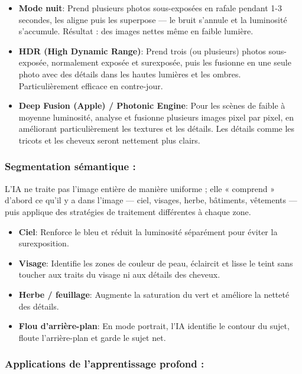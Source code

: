 \begin{itemize}
  \item \textbf{Mode nuit}: Prend plusieurs photos sous-exposées en rafale pendant 1-3 secondes, les aligne puis les superpose — le bruit s'annule et la luminosité s'accumule. Résultat : des images nettes même en faible lumière.
  \item \textbf{HDR (High Dynamic Range)}: Prend trois (ou plusieurs) photos sous-exposée, normalement exposée et surexposée, puis les fusionne en une seule photo avec des détails dans les hautes lumières et les ombres. Particulièrement efficace en contre-jour.
  \item \textbf{Deep Fusion (Apple) / Photonic Engine}: Pour les scènes de faible à moyenne luminosité, analyse et fusionne plusieurs images pixel par pixel, en améliorant particulièrement les textures et les détails. Les détails comme les tricots et les cheveux seront nettement plus clairs.
\end{itemize}

\subsubsection*{Segmentation sémantique :}

L'IA ne traite pas l'image entière de manière uniforme ; elle « comprend » d'abord ce qu'il y a dans l'image — ciel, visages, herbe, bâtiments, vêtements — puis applique des stratégies de traitement différentes à chaque zone.

\begin{itemize}
  \item \textbf{Ciel}: Renforce le bleu et réduit la luminosité séparément pour éviter la surexposition.
  \item \textbf{Visage}: Identifie les zones de couleur de peau, éclaircit et lisse le teint sans toucher aux traits du visage ni aux détails des cheveux.
  \item \textbf{Herbe / feuillage}: Augmente la saturation du vert et améliore la netteté des détails.
  \item \textbf{Flou d'arrière-plan}: En mode portrait, l'IA identifie le contour du sujet, floute l'arrière-plan et garde le sujet net.
\end{itemize}

\subsubsection*{Applications de l'apprentissage profond :}


